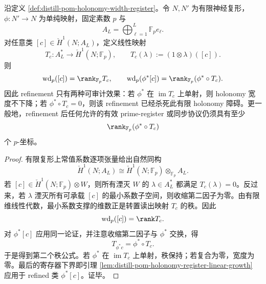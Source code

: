 \begin{proposition}\label{prop:distill-pom-refinement-holonomy-width-dichotomy}
沿定义 \ref{def:distill-pom-holonomy-width-register}。令 \(N,N'\) 为有限神经复形，\(\phi:N'\to N\) 为单纯映射，固定素数 \(p\) 与
\[
A_L=\bigoplus_{\ell=1}^L\mathbb F_p e_\ell .
\]
对任意类 \([c]\in\check H^1(N;A_L)\)，定义线性映射
\[
T_c:A_L^\ast\longrightarrow \check H^1(N;\mathbb F_p),
\qquad
T_c(\lambda):=(1\otimes\lambda)([c]).
\]
则
\[
\operatorname{wd}_p([c])=\rank_{\mathbb F_p}T_c,
\qquad
\operatorname{wd}_p(\phi^*[c])=\rank_{\mathbb F_p}(\phi^*\circ T_c).
\]
因此 refinement 只有两种可审计效果：若 \(\phi^*\) 在 \(\operatorname{im}T_c\) 上单射，则 holonomy 宽度不下降；若 \(\phi^*\circ T_c=0\)，则该 refinement 已经杀死此有限 holonomy 障碍。更一般地，refinement 后任何允许的有效 prime-register 或同步协议仍须具有至少
\[
\rank_{\mathbb F_p}(\phi^*\circ T_c)
\]
个 \(p\)-坐标。
\end{proposition}
\begin{proof}
有限复形上常值系数逐项张量给出自然同构
\[
\check H^1(N;A_L)\cong \check H^1(N;\mathbb F_p)\otimes_{\mathbb F_p} A_L.
\]
若 \([c]\in \check H^1(N;\mathbb F_p)\otimes W\)，则所有湮灭 \(W\) 的 \(\lambda\in A_L^\ast\) 都满足 \(T_c(\lambda)=0\)。反过来，若 \(\lambda\) 湮灭所有可承载 \([c]\) 的最小系数子空间，则收缩第二因子为零。由有限维线性代数，最小系数支撑的维数正是转置读出映射 \(T_c\) 的秩。因此
\[
\operatorname{wd}_p([c])=\rank T_c.
\]
对 \(\phi^*[c]\) 应用同一论证，并注意收缩第二因子与 \(\phi^*\) 交换，得
\[
T_{\phi^*c}=\phi^*\circ T_c.
\]
于是得到第二个秩公式。若 \(\phi^*\) 在 \(\operatorname{im}T_c\) 上单射，秩保持；若复合为零，宽度为零。最后的寄存器下界即引理 \ref{lem:distill-pom-holonomy-register-linear-growth} 应用于 refined 类 \(\phi^*[c]\)。证毕。
\end{proof}
